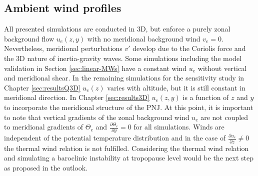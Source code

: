 \subsection*{Ambient wind profiles}
All presented simulations are conducted in 3D, but enforce a purely zonal background flow $u_e(z,y)$ with no meridional background wind $v_e=0$. Nevertheless, meridional perturbations $v'$ develop due to the Coriolis force and the 3D nature of inertia-gravity waves. Some simulations including the model validation in Section \ref{sec:linear-MWs} have a constant wind $u_e$ without vertical and meridional shear. In the remaining simulations for the sensitivity study in Chapter \ref{sec:resultsQ3D} $u_e(z)$ varies with altitude, but it is still constant in meridional direction. In Chapter \ref{sec:results3D} $u_e(z,y)$ is a function of $z$ and $y$ to incorporate the meridional structure of the PNJ. At this point, it is important to note that vertical gradients of the zonal background wind $u_e$ are not coupled to meridional gradients of $\Theta_e$ and $\frac{\partial \Theta_e}{\partial y}=0$ for all simulations. Winds are independent of the potential temperature distribution and in the case of $\frac{\partial u_e}{\partial z} \neq 0$ the thermal wind relation is not fulfilled. Considering the thermal wind relation and simulating a baroclinic instability at tropopause level would be the next step as proposed in the outlook.

